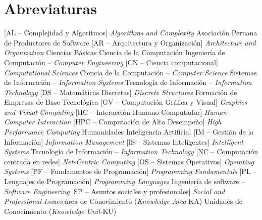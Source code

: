 \chapter*{Abreviaturas}
%

\begin{acronym}
 [AL -- Complejidad y Algoritmos]
          {{\it Algorithms and Complexity}}
 {Asociación Peruana de Productores de Software}
 [AR -- Arquitectura y Organización]
          {{\it Architecture and Organization}}
 {Ciencias Básicas}
 {Ciencia de la Computación}
 {Ingenierí­a de Computación -- {\it Computer Engineering}}
 [CN -- Ciencia computacional]
          {{\it Computational Sciences}}
 {Ciencia de la Computación -- {\it Computer Science}}
 {Sistemas de Información -- {\it Information Systems}}
 {Tecnologí­a de Información -- {\it Information Technology}}
 [DS -- Matemáticas Discretas]
          {{\it Discrete Structures}}
 {Formación de Empresas de Base Tecnológica}
 [GV -- Computación Gráfica y Visual]
          {{\it Graphics and Visual Computing}}
 [HC -- Interacción Humano-Computador]
          {{\it Human-Computer Interaction}}
[HPC -- Computación de Alto Desempeño]
	  {{\it High Performance Computing}}
 {Humanidades}
 {Inteligencia Artificial}
 [IM -- Gestión de la Información]
          {{\it Information Management}}
 [IS -- Sistemas Inteligentes]
          {{\it Intelligent Systems}}
 {Tecnologí­a de Información -- {\it Information Technology}}
 [NC -- Computación centrada en redes]
          {{\it Net-Centric Computing}}
 [OS -- Sistemas Operativos]
          {{\it Operating Systems}}
 [PF -- Fundamentos de Programación]
          {{\it Programming Fundamentals}}
 [PL -- Lenguajes de Programación]
          {{\it Programming Languages}}
 {Ingenierí­a de software -- {\it Software Engineering}}
 [SP -- Asuntos sociales y profesionales]
          {{\it Social and Professional Issues}}
 {área de Conocimiento ({\it Knowledge Area}-KA)}
 {Unidades de Conocimiento ({\it Knowledge Unit}-KU)}

\end{acronym}
